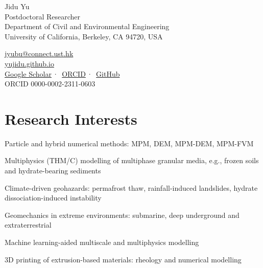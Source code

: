 \documentclass[10pt]{article}
\begin{document}
\begin{minipage}[b]{0.6\linewidth}
  {\namefont\fontsize{30}{32}\selectfont\color{ink}Jidu Yu}\\[7pt]
  {\sffamily\fontsize{12.5}{14}\selectfont\color{accent}Postdoctoral Researcher}\\[3pt]
  {\sffamily\small\color{muted}Department of Civil and Environmental Engineering\\
   University of California, Berkeley, CA 94720, USA}
\end{minipage}\hfill
\begin{minipage}[b]{0.38\linewidth}\raggedleft\sffamily\small\linespread{1.25}\selectfont
  \href{mailto:jyubu@connect.ust.hk}{jyubu@connect.ust.hk}\\
  \href{https://yujidu.github.io}{yujidu.github.io}\\
  \href{https://scholar.google.com/citations?user=AgtKCIIAAAAJ}{Google Scholar}\,·\,%
  \href{https://orcid.org/0000-0002-2311-0603}{ORCID}\,·\,%
  \href{https://github.com/yujidu}{GitHub}\\
  {\color{muted}ORCID 0000-0002-2311-0603}
\end{minipage}

\vspace{8pt}{\color{accent}\rule{\linewidth}{1.3pt}}\vspace{-4pt}

\section{Research Interests}
\vspace{-1pt}
\vspace{-3pt}
\begin{cvbullets}
  \item Particle and hybrid numerical methods: MPM, DEM, MPM-DEM, MPM-FVM
  \item Multiphysics (THM/C) modelling of multiphase granular media, e.g., frozen soils and hydrate-bearing sediments
  \item Climate-driven geohazards: permafrost thaw, rainfall-induced landslides, hydrate dissociation-induced instability
  \item Geomechanics in extreme environments: submarine, deep underground and extraterrestrial
  \item Machine learning-aided multiscale and multiphysics modelling
  \item 3D printing of extrusion-based materials: rheology and numerical modelling
\end{cvbullets}
\end{document}
